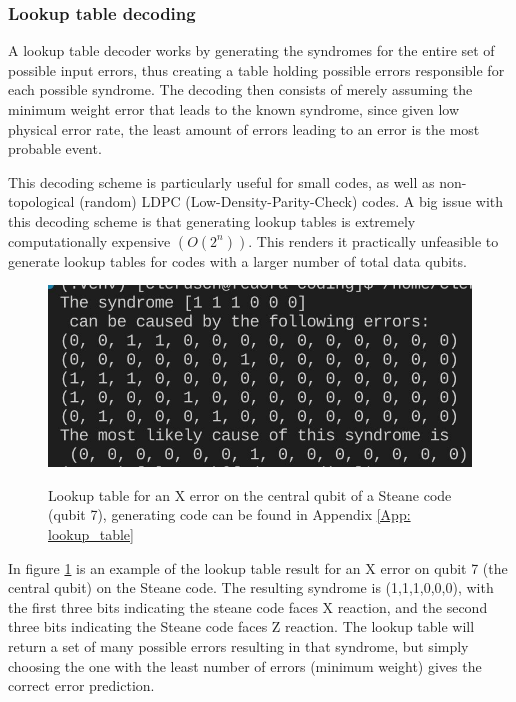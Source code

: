 \subsubsection{Lookup table decoding}
A lookup table decoder works by generating the 
syndromes for the entire set of possible input errors, thus creating a 
table holding possible errors responsible for each possible syndrome.
The decoding then consists of merely assuming the minimum weight
error that leads to the known syndrome, since given low physical 
error rate, the least amount of errors leading to an error is the most
probable event.

This decoding scheme is particularly useful for small codes, as well 
as non-topological (random) LDPC (Low-Density-Parity-Check) codes.
A big issue with this decoding scheme is that generating lookup tables is
extremely computationally expensive $(O(2^n))$. This renders it practically
unfeasible to generate lookup tables for codes with a larger number
of total data qubits.

\begin{figure}[h!]
	\begin{center}
	\captionsetup{justification=centering,margin=2cm}
	\includegraphics[scale=0.7]{./img/figures/X7errorlookup.png}\\
	\caption{Lookup table for an X error on the central qubit of
    a Steane code (qubit 7), generating code can be found in Appendix
    \ref{App: lookup_table}}
        
	\label{fig: lookup_table}
	\end{center}
\end{figure}

In figure \ref{fig: lookup_table} is an example of the lookup table result for
an X error on qubit 7 (the central qubit) on the Steane code. 
The resulting syndrome is (1,1,1,0,0,0), with the first three
bits indicating the steane code faces X reaction, and the second three bits
indicating the Steane code faces Z reaction. 
The lookup table will return a set of many possible errors resulting in 
that syndrome, but simply choosing the one with the least number of errors 
(minimum weight) gives the correct error prediction.

